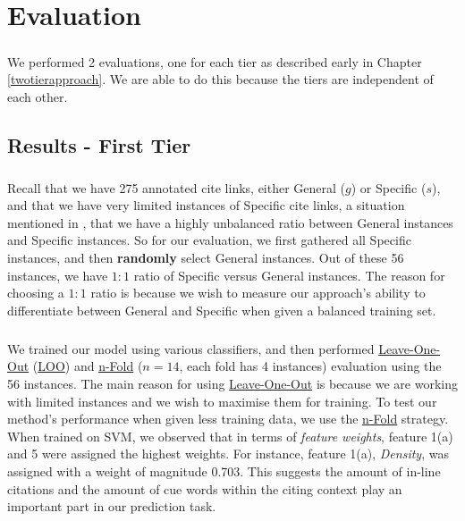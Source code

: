 \chapter{Evaluation}
\label{evaluation}
\paragraph{}
We performed 2 evaluations, one for each tier as described early in Chapter \ref{twotierapproach}. We are able to do this because the tiers are independent of each other.

\section{Results - First Tier}
\paragraph{}
Recall that we have 275 annotated cite links, either General ($g$) or Specific ($s$), and that we have very limited instances of Specific cite links, a situation mentioned in \cite{li2010negative}, that we have a highly unbalanced ratio between General instances and Specific instances. So for our evaluation, we first gathered all Specific instances, and then \textbf{randomly} select General instances. Out of these 56 instances, we have $1:1$ ratio of Specific versus General instances. The reason for choosing a $1:1$ ratio is because we wish to measure our approach's ability to differentiate between General and Specific when given a balanced training set.

\paragraph{}
We trained our model using various classifiers, and then performed \url{Leave-One-Out} (\url{LOO}) and \url{n-Fold} ($n=14$, each fold has 4 instances) evaluation using the 56 instances. The main reason for using \url{Leave-One-Out} is because we are working with limited instances and we wish to maximise them for training. To test our method's performance when given less training data, we use the \url{n-Fold} strategy. When trained on SVM, we observed that in terms of \textit{feature weights}, feature 1(a) and 5 were assigned the highest weights. For instance, feature 1(a), \textit{Density}, was assigned with a weight of magnitude 0.703. This suggests the amount of in-line citations and the amount of cue words within the citing context play an important part in our prediction task.


